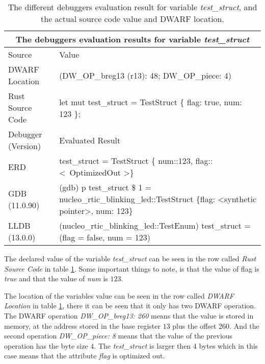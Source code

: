 \begin{table}[h]
	\centering
	\small
	\begin{tabular}{ |p{2cm}|p{8cm}|  }
		\hline
		\multicolumn{2}{|c|}{\textbf{The debuggers evaluation results for variable \emph{test\_struct}}} \\ 
		\hline
		\hline
		Source & Value \\
		\hline

		DWARF Location & (DW\_OP\_breg13 (r13): 48; DW\_OP\_piece: 4) \\

		Rust Source Code & let mut test\_struct = TestStruct \{ flag: true, num: 123 \}; \\
		\hline
		\hline
		Debugger (Version) & Evaluated Result \\
		\hline
		ERD & test\_struct = TestStruct \{ num::123, flag::\textless \ OptimizedOut \textgreater \} \\

		GDB (11.0.90)  & (gdb) p test\_struct\newline
		\$ 1 = nucleo\_rtic\_blinking\_led::TestStruct \{flag: \textless synthetic pointer\textgreater, num: 123\} \\

		LLDB (13.0.0) & (nucleo\_rtic\_blinking\_led::TestEnum) test\_struct = (flag = false, num = 123) \\
		\hline
	\end{tabular}
	\label{table:struct}
	\caption{The different debuggers evaluation result for variable \emph{test\_struct}, and the actual source code value and DWARF location.}
\end{table}


The declared value of the variable \emph{test\_struct} can be seen in the row called \emph{Rust Source Code} in table \ref{table:struct}.
Some important things to note, is that the value of flag is \emph{true} and that the value of \emph{num} is $123$.


The location of the variables value can be seen in the row called \emph{DWARF Location} in table \ref{table:struct}, there it can be seen that it only has two \gls{DWARF} operation.
The \gls{DWARF} operation \emph{DW\_OP\_breg13: 260} means that the value is stored in memory, at the address stored in the base register $13$ plus the offset $260$. 
And the second operation \emph{DW\_OP\_piece: 8} means that the value of the previous operation has the byte size $4$.
The \emph{test\_struct} is larger then $4$ bytes which in this case means that the attribute \emph{flag} is optimized out.



